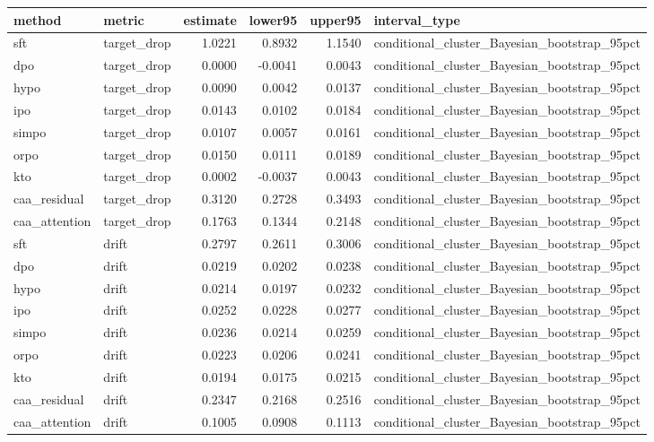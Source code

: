 \begin{tabular}{llrrrl}
\toprule
method & metric & estimate & lower95 & upper95 & interval\_type \\
\midrule
sft & target\_drop & 1.0221 & 0.8932 & 1.1540 & conditional\_cluster\_Bayesian\_bootstrap\_95pct \\
dpo & target\_drop & 0.0000 & -0.0041 & 0.0043 & conditional\_cluster\_Bayesian\_bootstrap\_95pct \\
hypo & target\_drop & 0.0090 & 0.0042 & 0.0137 & conditional\_cluster\_Bayesian\_bootstrap\_95pct \\
ipo & target\_drop & 0.0143 & 0.0102 & 0.0184 & conditional\_cluster\_Bayesian\_bootstrap\_95pct \\
simpo & target\_drop & 0.0107 & 0.0057 & 0.0161 & conditional\_cluster\_Bayesian\_bootstrap\_95pct \\
orpo & target\_drop & 0.0150 & 0.0111 & 0.0189 & conditional\_cluster\_Bayesian\_bootstrap\_95pct \\
kto & target\_drop & 0.0002 & -0.0037 & 0.0043 & conditional\_cluster\_Bayesian\_bootstrap\_95pct \\
caa\_residual & target\_drop & 0.3120 & 0.2728 & 0.3493 & conditional\_cluster\_Bayesian\_bootstrap\_95pct \\
caa\_attention & target\_drop & 0.1763 & 0.1344 & 0.2148 & conditional\_cluster\_Bayesian\_bootstrap\_95pct \\
sft & drift & 0.2797 & 0.2611 & 0.3006 & conditional\_cluster\_Bayesian\_bootstrap\_95pct \\
dpo & drift & 0.0219 & 0.0202 & 0.0238 & conditional\_cluster\_Bayesian\_bootstrap\_95pct \\
hypo & drift & 0.0214 & 0.0197 & 0.0232 & conditional\_cluster\_Bayesian\_bootstrap\_95pct \\
ipo & drift & 0.0252 & 0.0228 & 0.0277 & conditional\_cluster\_Bayesian\_bootstrap\_95pct \\
simpo & drift & 0.0236 & 0.0214 & 0.0259 & conditional\_cluster\_Bayesian\_bootstrap\_95pct \\
orpo & drift & 0.0223 & 0.0206 & 0.0241 & conditional\_cluster\_Bayesian\_bootstrap\_95pct \\
kto & drift & 0.0194 & 0.0175 & 0.0215 & conditional\_cluster\_Bayesian\_bootstrap\_95pct \\
caa\_residual & drift & 0.2347 & 0.2168 & 0.2516 & conditional\_cluster\_Bayesian\_bootstrap\_95pct \\
caa\_attention & drift & 0.1005 & 0.0908 & 0.1113 & conditional\_cluster\_Bayesian\_bootstrap\_95pct \\

\end{tabular}
